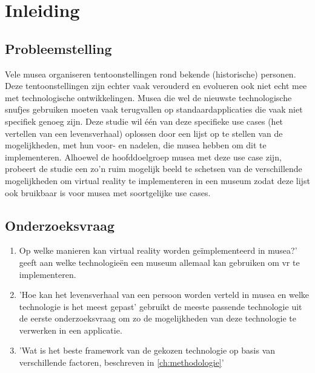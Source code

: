 
\chapter{Inleiding}
\label{ch:inleiding}

\section{Probleemstelling}
\label{sec:probleemstelling}

Vele musea organiseren tentoonstellingen rond bekende (historische) personen. Deze tentoonstellingen zijn echter vaak verouderd en evolueren ook niet echt mee met technologische ontwikkelingen. Musea die wel de nieuwste technologische snufjes gebruiken moeten vaak terugvallen op standaardapplicaties die vaak niet specifiek genoeg zijn. Deze studie wil één van deze specifieke use cases (het vertellen van een levensverhaal) oplossen door een lijst op te stellen van de mogelijkheden, met hun voor- en nadelen, die musea hebben om dit te implementeren. Alhoewel de hoofddoelgroep musea met deze use case zijn, probeert de studie een zo'n ruim mogelijk beeld te schetsen van de verschillende mogelijkheden om virtual reality te implementeren in een museum zodat deze lijst ook bruikbaar is voor musea met soortgelijke use cases.

\section{Onderzoeksvraag}
\label{sec:onderzoeksvraag}

\begin{enumerate}
    \item Op welke manieren kan virtual reality worden geïmplementeerd in musea?' geeft aan welke technologieën een museum allemaal kan gebruiken om \acrshort{vr} te implementeren.
    \item 'Hoe kan het levensverhaal van een persoon worden verteld in musea en welke technologie is het meest gepast' gebruikt de meeste passende technologie uit de eerste onderzoeksvraag om zo de mogelijkheden van deze technologie te verwerken in een applicatie.
    \item 'Wat is het beste framework van de gekozen technologie op basis van verschillende factoren, beschreven in \ref{ch:methodologie}' 
\end{enumerate}

